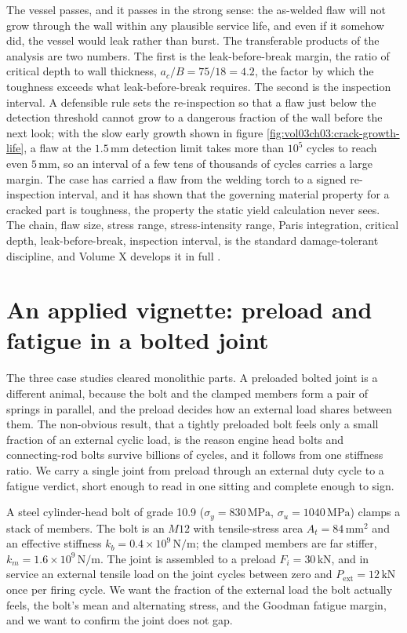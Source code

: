 The vessel passes, and it passes in the strong sense: the as-welded flaw
will not grow through the wall within any plausible service life, and
even if it somehow did, the vessel would leak rather than burst. The
transferable products of the analysis are two numbers. The first is the
leak-before-break margin, the ratio of critical depth to wall thickness,
$a_c/B = 75/18 = 4.2$, the factor by which the toughness exceeds what
leak-before-break requires. The second is the inspection interval. A
defensible rule sets the re-inspection so that a flaw just below the
detection threshold cannot grow to a dangerous fraction of the wall
before the next look; with the slow early growth shown in figure
\ref{fig:vol03ch03:crack-growth-life}, a flaw at the $1.5\,\si{\milli
\meter}$ detection limit takes more than $10^5$ cycles to reach even
$5\,\si{\milli\meter}$, so an interval of a few tens of thousands of
cycles carries a large margin. The case has carried a flaw from the
welding torch to a signed re-inspection interval, and it has shown that
the governing material property for a cracked part is toughness, the
property the static yield calculation never sees. The chain, flaw size,
stress range, stress-intensity range, Paris integration, critical depth,
leak-before-break, inspection interval, is the standard damage-tolerant
discipline, and Volume X develops it in full
\cite{text:hertzberg-fatigue}.

\section{An applied vignette: preload and fatigue in a bolted
joint}

The three case studies cleared monolithic parts. A preloaded bolted
joint is a different animal, because the bolt and the clamped members
form a pair of springs in parallel, and the preload decides how an
external load shares between them. The non-obvious result, that a tightly
preloaded bolt feels only a small fraction of an external cyclic load, is
the reason engine head bolts and connecting-rod bolts survive billions of
cycles, and it follows from one stiffness ratio. We carry a single joint
from preload through an external duty cycle to a fatigue verdict, short
enough to read in one sitting and complete enough to sign.

A steel cylinder-head bolt of grade 10.9 ($\sigma_y = 830\,\text{MPa}$,
$\sigma_u = 1040\,\text{MPa}$) clamps a stack of members. The bolt is an
$M12$ with tensile-stress area $A_t = 84\,\si{\milli\meter}^2$ and an
effective stiffness $k_b = 0.4\times 10^9\,\text{N/m}$; the clamped
members are far stiffer, $k_m = 1.6\times 10^9\,\text{N/m}$. The joint is
assembled to a preload $F_i = 30\,\text{kN}$, and in service an external
tensile load on the joint cycles between zero and $P_{\text{ext}} =
12\,\text{kN}$ once per firing cycle. We want the fraction of the external
load the bolt actually feels, the bolt's mean and alternating stress, and
the Goodman fatigue margin, and we want to confirm the joint does not
gap.


